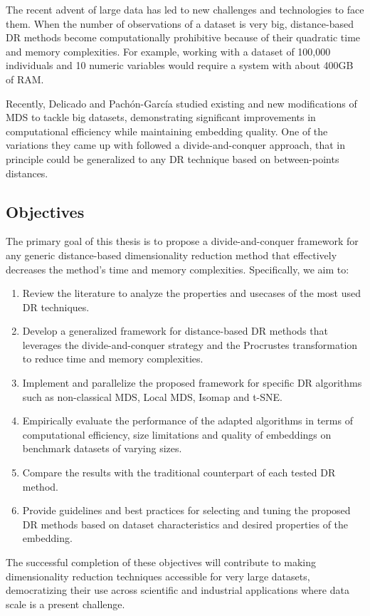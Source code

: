The recent advent of large data has led to new challenges and technologies to face them. When the number of observations of a dataset is very big, distance-based DR methods become computationally prohibitive because of their quadratic time and memory complexities. For example, working with a dataset of 100,000 individuals and 10 numeric variables would require a system with about 400GB of RAM.

Recently, Delicado and Pachón-García \cite{Delicado2024MDSBigData} studied existing and new modifications of MDS to tackle big datasets, demonstrating significant improvements in computational efficiency while maintaining embedding quality. One of the variations they came up with followed a divide-and-conquer approach, that in principle could be generalized to any DR technique based on between-points distances.

\subsection{Objectives}

The primary goal of this thesis is to propose a divide-and-conquer framework for any generic distance-based dimensionality reduction method that effectively decreases the method's time and memory complexities. Specifically, we aim to:

\begin{enumerate}
    \item Review the literature to analyze the properties and usecases of the most used DR techniques.
    \item Develop a generalized framework for distance-based DR methods that leverages the divide-and-conquer strategy and the Procrustes transformation to reduce time and memory complexities.
    \item Implement and parallelize the proposed framework for specific DR algorithms such as non-classical MDS, Local MDS, Isomap and t-SNE.
    \item Empirically evaluate the performance of the adapted algorithms in terms of computational efficiency, size limitations and quality of embeddings on benchmark datasets of varying sizes.
    \item Compare the results with the traditional counterpart of each tested DR method.
    \item Provide guidelines and best practices for selecting and tuning the proposed DR methods based on dataset characteristics and desired properties of the embedding.
\end{enumerate}

The successful completion of these objectives will contribute to making  dimensionality reduction techniques accessible for very large datasets, democratizing their use across scientific and industrial applications where data scale is a present challenge.